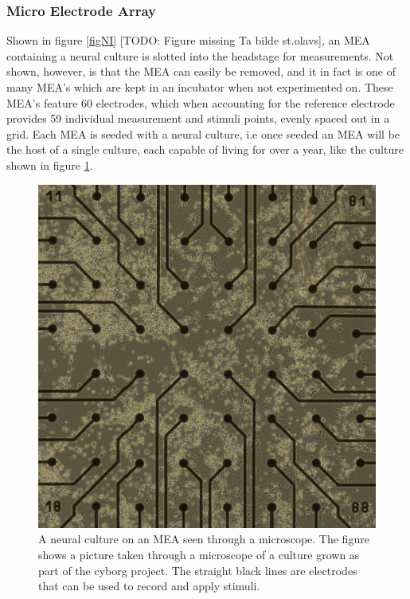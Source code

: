 \subsubsection{Micro Electrode Array}
Shown in figure \ref{figNI} [TODO: Figure missing Ta bilde st.olavs], an MEA
containing a neural culture is slotted into the headstage for measurements.
Not shown, however, is that the MEA can easily be removed, and it in fact is one
of many MEA's which are kept in an incubator when not experimented on.
These MEA's feature 60 electrodes, which when accounting for the reference
electrode provides 59 individual measurement and stimuli points, evenly spaced
out in a grid.
Each MEA is seeded with a neural culture, i.e once seeded an MEA will
be the host of a single culture, each capable of living for over a year, like
the culture shown in figure \ref{frank}.
\begin{figure}[h]
  \centering
  \includegraphics[width=1\textwidth]{fig/frank.png}
  \caption{
    A neural culture on an MEA seen through a microscope.
    The figure shows a picture taken through a microscope of a culture grown as
    part of the cyborg project.
    The straight black lines are electrodes that can be used to record and apply
    stimuli.
  }
  \label{frank}
\end{figure}
